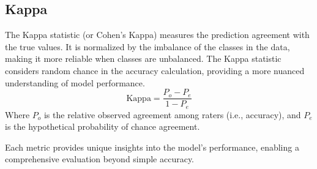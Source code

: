 \subsection{Kappa}
The Kappa statistic (or Cohen's Kappa) measures the prediction agreement with the true values. It is normalized by the imbalance of the classes in the data, making it more reliable when classes are unbalanced. The Kappa statistic considers random chance in the accuracy calculation, providing a more nuanced understanding of model performance.
\[
\text{Kappa} = \frac{P_o - P_e}{1 - P_e}
\]
Where \(P_o\) is the relative observed agreement among raters (i.e., accuracy), and \(P_e\) is the hypothetical probability of chance agreement.

Each metric provides unique insights into the model's performance, enabling a comprehensive evaluation beyond simple accuracy. 
